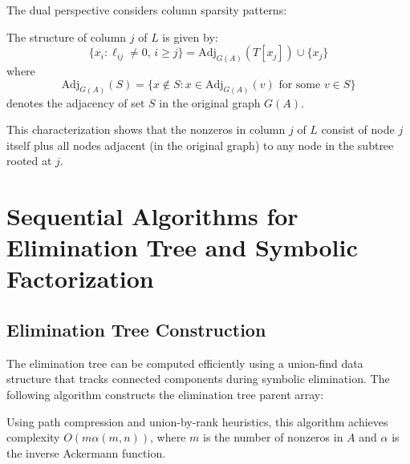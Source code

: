 The dual perspective considers column sparsity patterns:

\begin{theorem}
The structure of column \(j\) of \(L\) is given by:
\[
\{x_i : \ell_{ij} \neq 0,\, i \geq j\} = \text{Adj}_{G(A)}(T[x_j]) \cup \{x_j\}
\]
where
\[
\text{Adj}_{G(A)}(S) = \{x \notin S : x \in \text{Adj}_{G(A)}(v) \text{ for some } v \in S\}
\]
denotes the adjacency of set \(S\) in the original graph \(G(A)\).
\end{theorem}

This characterization shows that the nonzeros in column \(j\) of \(L\) consist of node \(j\) itself plus all nodes adjacent (in the original graph) to any node in the subtree rooted at \(j\).

\section{Sequential Algorithms for Elimination Tree and Symbolic Factorization}

\subsection{Elimination Tree Construction}

The elimination tree can be computed efficiently using a union-find data structure that tracks connected components during symbolic elimination. The following algorithm constructs the elimination tree parent array:



Using path compression and union-by-rank heuristics, this algorithm achieves complexity $O(m\alpha(m,n))$, where $m$ is the number of nonzeros in $A$ and $\alpha$ is the inverse Ackermann function.

